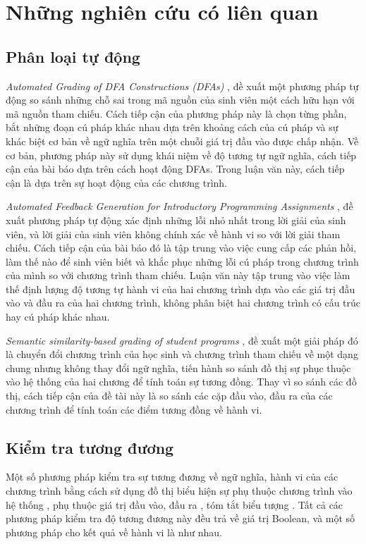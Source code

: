 \section{Những nghiên cứu có liên quan}

	\subsection{Phân loại tự động}
	
	\textit{Automated Grading of DFA Constructions (DFAs)} \cite{alur2013automated}, đề xuất một phương pháp tự động so sánh những chỗ sai trong mã nguồn của sinh viên một cách hữu hạn với mã nguồn tham chiếu. Cách tiếp cận của phương pháp này là chọn từng phần, bắt những đoạn cú pháp khác nhau dựa trên khoảng cách của cú pháp và sự khác biệt cơ bản về ngữ nghĩa trên một chuỗi giá trị đầu vào được chấp nhận. Về cơ bản, phương pháp này sử dụng khái niệm về độ tương tự ngữ nghĩa, cách tiếp cận của bài báo dựa trên cách hoạt động DFAs. Trong luận văn này, cách tiếp cận là dựa trên sự hoạt động của các chương trình.
	
	\textit{Automated Feedback Generation for Introductory Programming Assignments} \cite{singh2013automated}, đề xuất phương pháp tự động xác định những lỗi nhỏ nhất trong lời giải của sinh viên, và lời giải của sinh viên không chính xác về hành vi so với lời giải tham chiếu. Cách tiếp cận của bài báo đó là tập trung vào việc cung cấp các phản hồi, làm thế nào để sinh viên biết và khắc phục những lỗi cú pháp trong chương trình của mình so với chương trình tham chiếu. Luận văn này tập trung vào việc làm thế định lượng độ tương tự hành vi của hai chương trình dựa vào các giá trị đầu vào và đầu ra của hai chương trình, không phân biệt hai chương trình có cấu trúc hay cú pháp khác nhau.

	\textit{Semantic similarity-based grading of student programs} \cite{wang2007semantic}, đề xuất một giải pháp đó là chuyển đổi chương trình của học sinh và chương trình tham chiếu về một dạng chung nhưng không thay đổi ngữ nghĩa, tiến hành so sánh đồ thị sự phục thuộc vào hệ thống của hai chương để tính toán sự tương đồng. Thay vì so sánh các đồ thị, cách tiếp cận của đề tài này là so sánh các cặp đầu vào, đầu ra của các chương trình để tính toán các điểm tương đồng về hành vi. 
	
	\subsection{Kiểm tra tương đương}
	Một số phương pháp kiểm tra sự tương đương về ngữ nghĩa, hành vi của các chương trình bằng cách sử dụng đồ thị biểu hiện sự phụ thuộc chương trình vào hệ thống \cite{bates1993incremental} \cite{binkley1992using}, phụ thuộc giá trị đầu vào, đầu ra \cite{jackson1994semantic}, tóm tắt biểu tượng \cite{person2008differential}. Tất cả các phương pháp kiểm tra độ tương đương này đều trả về giá trị Boolean, và một số phương pháp cho kết quả về hành vi là như nhau. 
	
